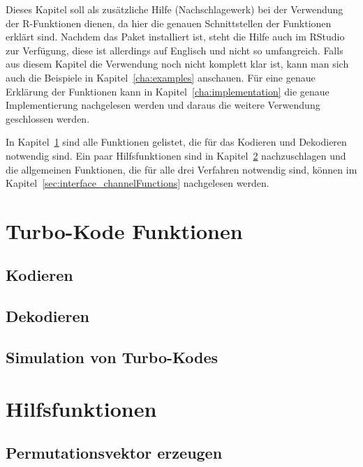 Dieses Kapitel soll als zusätzliche Hilfe (Nachschlagewerk) bei der Verwendung der R-Funktionen dienen, da hier die genauen Schnittstellen der Funktionen erklärt sind. Nachdem das Paket installiert ist, steht die Hilfe auch im RStudio zur Verfügung, diese ist allerdings auf Englisch und nicht so umfangreich. Falls aus diesem Kapitel die Verwendung noch nicht komplett klar ist, kann man sich auch die Beispiele in Kapitel~\ref{cha:examples} anschauen. Für eine genaue Erklärung der Funktionen kann in Kapitel~\ref{cha:implementation} die genaue Implementierung nachgelesen werden und daraus die weitere Verwendung geschlossen werden.

In Kapitel~\ref{sec:interface_turboFunctions} sind alle Funktionen gelistet, die für das Kodieren und Dekodieren notwendig sind. Ein paar Hilfsfunktionen sind in Kapitel~\ref{sec:interface_helperFunctions} nachzuschlagen und die allgemeinen Funktionen, die für alle drei Verfahren notwendig sind, können im Kapitel~\ref{sec:interface_channelFunctions} nachgelesen werden. 


\section{Turbo-Kode Funktionen}
\label{sec:interface_turboFunctions}

\subsection{Kodieren}
\label{sec:interface_encode}


\subsection{Dekodieren}
\label{sec:interface_decode}


\subsection{Simulation von Turbo-Kodes}
\label{sec:interface_simulation}


\section{Hilfsfunktionen}
\label{sec:interface_helperFunctions}

\subsection{Permutationsvektor erzeugen}
\label{sec:interface_permutation}


